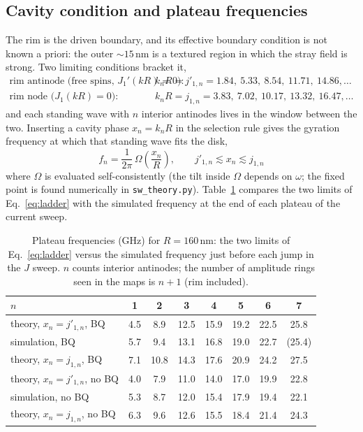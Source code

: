 \documentclass[11pt,a4paper]{article}
\begin{document}
\subsection{Cavity condition and plateau frequencies}
\label{sec:quant}
The rim is the driven boundary, and its effective boundary condition is not known a priori: the outer
$\sim15$\,nm is a textured region in which the stray field is strong.  Two limiting conditions bracket it,
\begin{align}
\text{rim antinode (free spins, } J_1'(kR)=0\text{):}\quad & k_nR=j'_{1,n}=1.84,\ 5.33,\ 8.54,\ 11.71,\ 14.86,\dots\nonumber\\
\text{rim node (}J_1(kR)=0\text{):}\quad & k_nR=j_{1,n}=3.83,\ 7.02,\ 10.17,\ 13.32,\ 16.47,\dots
\label{eq:quant}
\end{align}
and each standing wave with $n$ interior antinodes lives in the window between the two.  Inserting a cavity
phase $x_n=k_nR$ in the selection rule gives the gyration frequency at which that standing wave fits the disk,
\begin{equation}
\boxed{\;f_n=\frac{1}{2\pi}\,\Omega\!\left(\frac{x_n}{R}\right),\qquad j'_{1,n}\lesssim x_n\lesssim j_{1,n}\;}
\label{eq:ladder}
\end{equation}
where $\Omega$ is evaluated self-consistently (the tilt inside $\Omega$ depends on $\omega$; the fixed point
is found numerically in \texttt{sw\_theory.py}).  Table~\ref{tab:ladder} compares the two limits of
Eq.~\eqref{eq:ladder} with the simulated frequency at the end of each plateau of the current sweep.

\begin{table}[h]
\centering
\caption{Plateau frequencies (GHz) for $R=160$\,nm: the two limits of Eq.~\eqref{eq:ladder} versus the simulated
frequency just before each jump in the $J$ sweep.  $n$ counts interior antinodes; the number of amplitude rings
seen in the maps is $n+1$ (rim included).}
\label{tab:ladder}
\begin{tabular}{lccccccc}
\toprule
$n$ & 1 & 2 & 3 & 4 & 5 & 6 & 7\\
\midrule
theory, $x_n=j'_{1,n}$, BQ & 4.5 & 8.9 & 12.5 & 15.9 & 19.2 & 22.5 & 25.8\\
simulation, BQ   & 5.7 & 9.4 & 13.1 & 16.8 & 19.0 & 22.7 & (25.4)\\
theory, $x_n=j_{1,n}$, BQ & 7.1 & 10.8 & 14.3 & 17.6 & 20.9 & 24.2 & 27.5\\
\midrule
theory, $x_n=j'_{1,n}$, no BQ & 4.0 & 7.9 & 11.0 & 14.0 & 17.0 & 19.9 & 22.8\\
simulation, no BQ   & 5.3 & 8.7 & 12.0 & 15.4 & 17.9 & 19.4 & 22.1\\
theory, $x_n=j_{1,n}$, no BQ & 6.3 & 9.6 & 12.6 & 15.5 & 18.4 & 21.4 & 24.3\\
\bottomrule
\end{tabular}
\end{table}
\end{document}
